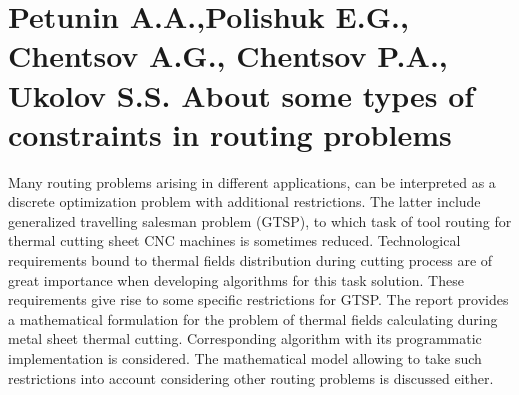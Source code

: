 \section*{Petunin A.A.,Polishuk E.G., Chentsov A.G., Chentsov P.A., Ukolov S.S.
About some types of constraints in routing problems}

Many routing problems arising in different applications,
can be interpreted as a discrete optimization problem with additional restrictions.
The latter include generalized travelling salesman problem (GTSP),
to which task of tool routing for thermal cutting sheet CNC machines
is sometimes reduced.
Technological requirements bound to thermal fields distribution
during cutting process are of great importance
when developing algorithms for this task solution.
These requirements give rise to some specific restrictions for GTSP.
The report provides a mathematical formulation
for the problem of thermal fields calculating
during metal sheet thermal cutting.
Corresponding algorithm with its programmatic implementation is considered.
The mathematical model allowing to take such restrictions into account
considering other routing problems is discussed either.
